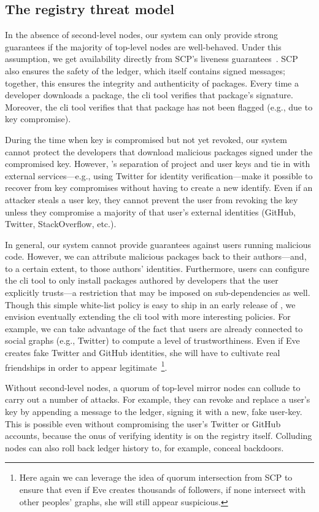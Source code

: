 \subsection{The registry threat model}
In the absence of second-level nodes, our system can only provide strong
guarantees if the majority of top-level nodes are well-behaved. Under
this assumption, we get availability directly from SCP's liveness
guarantees~\cite{stellar}. SCP also ensures the safety of the ledger,
which itself contains signed messages; together, this ensures the integrity
and authenticity of packages.
Every time a developer downloads a package, the \spam{} cli tool verifies that
package's signature. Moreover, the \spam{} cli tool verifies that that package
has not been flagged (e.g., due to key compromise). 

During the time when key is compromised but not yet revoked, our system
cannot protect the developers that download malicious packages signed under
the compromised key. However, \spam's separation of project and user keys and
tie in with external services---e.g., using Twitter for identity
verification---make it possible to recover from key compromises without having
to create a new identify. Even if an attacker steals a user key, they cannot
prevent the user from revoking the key unless they compromise a majority of
that user's external identities (GitHub, Twitter, StackOverflow, etc.). 

In general, our system cannot provide guarantees against users running malicious
code. However, we can attribute malicious packages back to their authors---and,
to a certain extent, to those authors' identities. Furthermore, users can
configure the \spam{} cli tool to only install packages authored by developers
that the user explicitly trusts---a restriction that may be imposed on sub-dependencies
as well. Though this simple white-list policy is easy to ship in an early release of
\spam, we envision eventually extending the cli tool with more interesting policies.
For example, we can take advantage of the fact that \spam users are already
connected to social graphs (e.g., Twitter) to compute a level of trustworthiness.
Even if Eve creates fake Twitter and GitHub identities, she will have to
cultivate real friendships in order to appear legitimate~\footnote{Here again
  we can leverage the idea of quorum intersection from SCP to
  ensure that even if Eve creates thousands of followers, if none intersect
  with other peoples' graphs, she will still appear suspicious.}.

Without second-level nodes, a quorum of top-level mirror nodes can collude to carry out
a number of attacks. For example, they can revoke and replace a user's key by appending
a \replaceuserkey message to the ledger, signing it with a new, fake user-key.
This is possible even without compromising the user's Twitter or GitHub accounts,
because the onus of verifying identity is on the registry itself. Colluding
nodes can also roll back ledger history to, for example, conceal backdoors.

